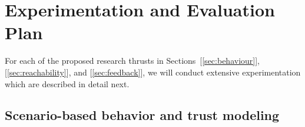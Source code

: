 
\section{Experimentation and Evaluation Plan}\label{sec:exp}
For each of the proposed research thrusts in Sections~[\ref{sec:behaviour}],[\ref{sec:reachability}], and [\ref{sec:feedback}], we will conduct extensive experimentation 
which are described in detail next.

\subsection{Scenario-based behavior and trust modeling}
\label{subsec:trust-modeling}



